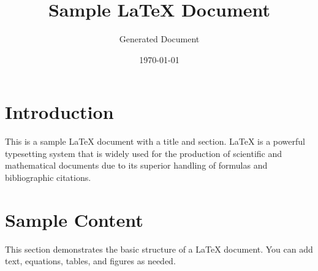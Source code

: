 \documentclass{article}
\title{Sample LaTeX Document}
\author{Generated Document}
\date{\today}
\begin{document}
\maketitle

\section{Introduction}
This is a sample LaTeX document with a title and section. LaTeX is a powerful typesetting system that is widely used for the production of scientific and mathematical documents due to its superior handling of formulas and bibliographic citations.

\section{Sample Content}
This section demonstrates the basic structure of a LaTeX document. You can add text, equations, tables, and figures as needed.
\end{document}
